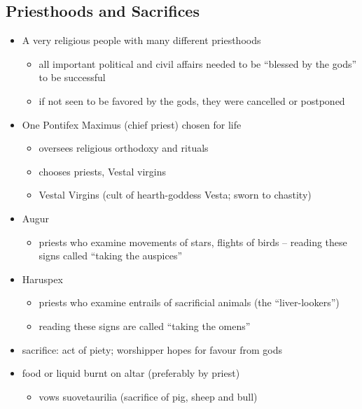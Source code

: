 \documentclass[12pt, twoside]{article}
\begin{document}
\subsection{Priesthoods and Sacrifices}
\begin{itemize}
\item A very religious people with many different priesthoods
	\begin{itemize}
	\item all important political and civil affairs needed to be “blessed by the gods” to be successful
	\item if not seen to be favored by the gods, they were cancelled or postponed
	\end{itemize}
\item One Pontifex Maximus (chief priest) chosen for life
	\begin{itemize}
	\item oversees religious orthodoxy and rituals
	\item chooses priests, Vestal virgins
	\item Vestal Virgins (cult of hearth-goddess Vesta; sworn to chastity)
	\end{itemize}
\item Augur
	\begin{itemize}
	\item priests who examine movements of stars, flights of birds – reading these signs called “taking the auspices”
	\end{itemize}
\item Haruspex
	\begin{itemize}
	\item priests who examine entrails of sacrificial animals (the “liver-lookers”)
	\item reading these signs are called “taking the omens”
	\end{itemize}
\item sacrifice: act of piety; worshipper hopes for favour from gods
\item food or liquid burnt on altar (preferably by priest) 
	\begin{itemize}
	\item vows suovetaurilia (sacrifice of pig, sheep and bull)
	\end{itemize}
\end{itemize}
\end{document}
